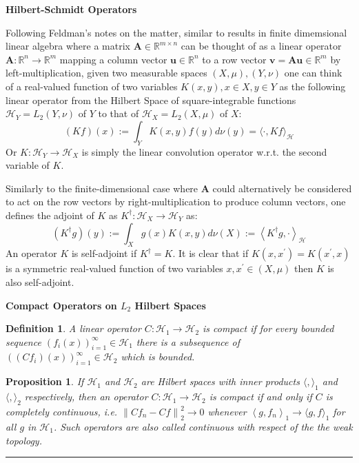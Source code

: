 \documentclass[11pt]{article}
\theoremstyle{plain} %
\newtheorem{proposition}[theorem]{Proposition}
\newtheorem{definition}[theorem]{Definition}
\theoremstyle{remark}
\begin{document}
\textbf{Hilbert-Schmidt Operators}

Following Feldman's notes on the matter, similar to results in finite
dimemsional linear algebra where a matrix $\mathbf{A} \in \mathbb{R}^{m \times
    n}$ can be thought of as a linear operator $\mathbf{A}: \mathbb{R}^{n}
  \rightarrow \mathbb{R}^{m}$ mapping a column vector $\mathbf{u} \in
  \mathbb{R}^{n}$ to a row vector $\mathbf{v}=\mathbf{A} \mathbf{u} \in
  \mathbb{R}^{m}$ by left-multiplication, given two measurable spaces $(X,
  \mu),(Y, \nu)$ one can think of a real-valued function of two variables $K(x,
  y), x \in X, y \in Y$ as the following linear operator from the Hilbert Space of
square-integrable functions $\mathcal{H}_{Y}=L_{2}(Y, \nu)$ of $Y$ to that of
$\mathcal{H}_{X}=L_{2}(X, \mu)$ of $X$:
$$
  (K f)(x):=\int_{Y} K(x, y) f(y) d \nu(y)=\langle\cdot, K f\rangle_{\mathcal{H}}
$$
Or $K: \mathcal{H}_{Y} \rightarrow \mathcal{H}_{X}$ is simply the linear
convolution operator w.r.t. the second variable of $K$.

Similarly to the finite-dimensional case where $\mathbf{A}$ could alternatively
be considered to act on the row vectors by right-multiplication to produce
column vectors, one defines the adjoint of $K$ as $K^{\dagger}: \mathcal{H}_{X}
  \rightarrow \mathcal{H}_{Y}$ as:
$$
  \left(K^{\dagger} g\right)(y):=\int_{X} g(x) K(x, y) d \nu(X):=\left\langle K^{\dagger} g, \cdot\right\rangle_{\mathcal{H}}
$$
An operator $K$ is self-adjoint if $K^{\dagger}=K$. It is clear that if
$K\left(x, x^{\prime}\right)=K\left(x^{\prime}, x\right)$ is a symmetric
real-valued function of two variables $x, x^{\prime} \in(X, \mu)$ then $K$ is
also self-adjoint.

\textbf{Compact Operators on $L_{2}$ Hilbert Spaces}
\begin{definition}
  A linear operator $C: \mathcal{H}_{1} \rightarrow \mathcal{H}_{2}$ is compact if
for every bounded sequence $\left(f_{i}(x)\right)_{i=1}^{\infty} \in
  \mathcal{H}_{1}$ there is a subsequence of $\left(\left(C
  f_{i}\right)(x)\right)_{i=1}^{\infty} \in \mathcal{H}_{2}$ which is bounded.
\end{definition}

\begin{proposition}
  If $\mathcal{H}_{1}$ and $\mathcal{H}_{2}$ are Hilbert spaces with inner
products $\langle,\rangle_{1}$ and $\langle,\rangle_{2}$ respectively, then an
operator $C: \mathcal{H}_{1} \rightarrow \mathcal{H}_{2}$ is compact if and only
if $C$ is completely continuous, i.e. $\left\|C f_{n}-C f\right\|_{2}^{2}
  \rightarrow 0$ whenever $\left\langle g, f_{n}\right\rangle_{1}
  \rightarrow\langle g, f\rangle_{1}$ for all $g$ in $\mathcal{H}_{1}$. Such
operators are also called continuous with respect of the the weak topology.
\end{proposition}
\vspace*{0.4em}
\hrule
\end{document}
